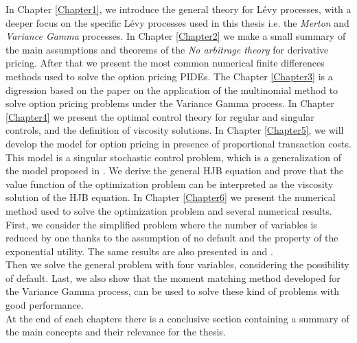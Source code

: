 In Chapter \ref{Chapter1}, we introduce the general theory for Lévy processes, with a deeper focus on the specific Lévy processes used in this thesis i.e.  
the \emph{Merton} and \emph{Variance Gamma} processes.   
In Chapter \ref{Chapter2} we make a small summary of the main assumptions and theorems of the \emph{No arbitrage theory} for derivative pricing. After that we present 
the most common numerical finite differences methods used to solve the option pricing PIDEs. 
The Chapter \ref{Chapter3} is a digression based on the paper \cite{Canta2} on the application of the multinomial method to solve option pricing problems under the Variance Gamma process. 
In Chapter \ref{Chapter4} we present the optimal control theory for regular and singular controls, and the definition of viscosity solutions. 
In Chapter \ref{Chapter5}, we will develop the model for option pricing in presence of proportional transaction costs. This model is a singular stochastic
control problem, which is a generalization of the model proposed in \cite{DaPaZa93}. We derive the general HJB equation and prove that the value function of the optimization problem 
can be interpreted as the viscosity solution of the HJB equation.  
In Chapter \ref{Chapter6} we present the numerical method used to solve the optimization problem and several numerical results. 
First, we consider the simplified problem where the number of variables is reduced by one thanks to the assumption of no default and the property of the exponential utility. 
The same results are also presented in \cite{Canta} and \cite{Matthias}.\\
Then we solve the general problem with four variables, considering the possibility of default. Last, we also show that the moment matching method developed for 
the Variance Gamma process, can be used to solve these kind of problems with good performance. \\
At the end of each chapters there is a conclusive section containing a summary of the main concepts and their relevance for the thesis. 

